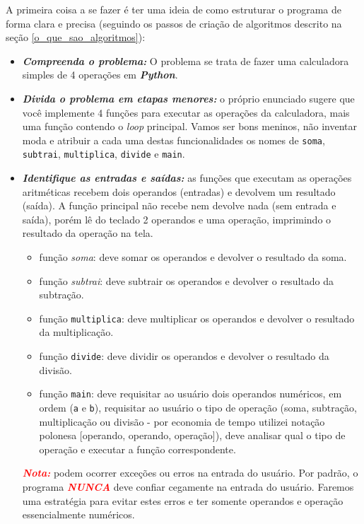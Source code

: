 \documentclass[a4paper, 12pt, onecolumn,singlespacing]{article}
\begin{document}
	A primeira coisa a se fazer é ter uma ideia de como estruturar o programa de forma clara e precisa (seguindo os passos de criação de algoritmos descrito na seção \ref{o_que_sao_algoritmos}):
	
	\begin{itemize}
	
	\item \textbf{\textit{Compreenda o problema:}} O problema se trata de fazer uma calculadora simples de 4 operações em \textbf{\textit{Python}}.
	
	\item \textbf{\textit{Divida o problema em etapas menores:}} o próprio enunciado sugere que você implemente 4 funções para executar as operações da calculadora, mais uma função contendo o \textit{loop} principal. Vamos ser bons meninos, não inventar moda e atribuir a cada uma destas funcionalidades os nomes de \texttt{soma}, \texttt{subtrai}, \texttt{multiplica}, \texttt{divide} e \texttt{main}.
	
	\item \textbf{\textit{Identifique as entradas e saídas:}} as funções que executam as operações aritméticas recebem dois operandos (entradas) e devolvem um resultado (saída). A função principal não recebe nem devolve nada (sem entrada e saída), porém lê do teclado 2 operandos e uma operação, imprimindo o resultado da operação na tela.
	
	\begin{itemize}
		\item função \textit{soma}: deve somar os operandos e devolver o resultado da soma.
		\item função \textit{subtrai}: deve subtrair os operandos e devolver o resultado da subtração.
		\item função \texttt{multiplica}: deve multiplicar os operandos e devolver o resultado da multiplicação.
		\item função \texttt{divide}: deve dividir os operandos e devolver o resultado da divisão.
		\item função \texttt{main}: deve requisitar ao usuário dois operandos numéricos, em ordem (\texttt{a} e \texttt{b}), requisitar ao usuário o tipo de operação (soma, subtração, multiplicação ou divisão - por economia de tempo utilizei notação polonesa [operando, operando, operação]), deve analisar qual o tipo de operação e executar a função correspondente.
	\end{itemize}
	
	\textbf{\textit{\textcolor{red}{Nota:} }} podem ocorrer exceções ou erros na entrada do usuário. Por padrão, o programa \textcolor{red}{\textbf{\textit{NUNCA}}} deve confiar cegamente na entrada do usuário. Faremos uma estratégia para evitar estes erros e ter somente operandos e operação essencialmente numéricos. 
	
	\end{itemize}
\end{document}
